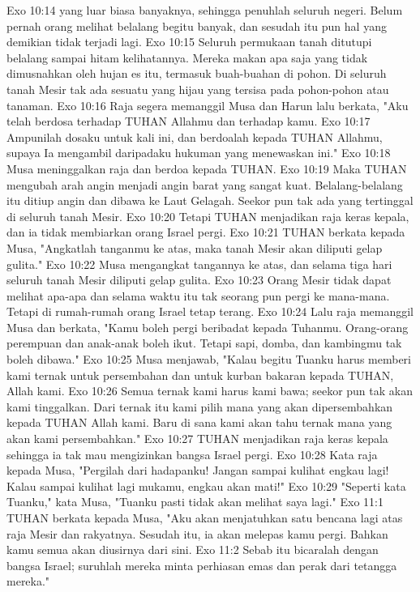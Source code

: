 Exo 10:14  yang luar biasa banyaknya, sehingga penuhlah seluruh negeri. Belum pernah orang melihat belalang begitu banyak, dan sesudah itu pun hal yang demikian tidak terjadi lagi.
Exo 10:15  Seluruh permukaan tanah ditutupi belalang sampai hitam kelihatannya. Mereka makan apa saja yang tidak dimusnahkan oleh hujan es itu, termasuk buah-buahan di pohon. Di seluruh tanah Mesir tak ada sesuatu yang hijau yang tersisa pada pohon-pohon atau tanaman.
Exo 10:16  Raja segera memanggil Musa dan Harun lalu berkata, "Aku telah berdosa terhadap TUHAN Allahmu dan terhadap kamu.
Exo 10:17  Ampunilah dosaku untuk kali ini, dan berdoalah kepada TUHAN Allahmu, supaya Ia mengambil daripadaku hukuman yang menewaskan ini."
Exo 10:18  Musa meninggalkan raja dan berdoa kepada TUHAN.
Exo 10:19  Maka TUHAN mengubah arah angin menjadi angin barat yang sangat kuat. Belalang-belalang itu ditiup angin dan dibawa ke Laut Gelagah. Seekor pun tak ada yang tertinggal di seluruh tanah Mesir.
Exo 10:20  Tetapi TUHAN menjadikan raja keras kepala, dan ia tidak membiarkan orang Israel pergi.
Exo 10:21  TUHAN berkata kepada Musa, "Angkatlah tanganmu ke atas, maka tanah Mesir akan diliputi gelap gulita."
Exo 10:22  Musa mengangkat tangannya ke atas, dan selama tiga hari seluruh tanah Mesir diliputi gelap gulita.
Exo 10:23  Orang Mesir tidak dapat melihat apa-apa dan selama waktu itu tak seorang pun pergi ke mana-mana. Tetapi di rumah-rumah orang Israel tetap terang.
Exo 10:24  Lalu raja memanggil Musa dan berkata, "Kamu boleh pergi beribadat kepada Tuhanmu. Orang-orang perempuan dan anak-anak boleh ikut. Tetapi sapi, domba, dan kambingmu tak boleh dibawa."
Exo 10:25  Musa menjawab, "Kalau begitu Tuanku harus memberi kami ternak untuk persembahan dan untuk kurban bakaran kepada TUHAN, Allah kami.
Exo 10:26  Semua ternak kami harus kami bawa; seekor pun tak akan kami tinggalkan. Dari ternak itu kami pilih mana yang akan dipersembahkan kepada TUHAN Allah kami. Baru di sana kami akan tahu ternak mana yang akan kami persembahkan."
Exo 10:27  TUHAN menjadikan raja keras kepala sehingga ia tak mau mengizinkan bangsa Israel pergi.
Exo 10:28  Kata raja kepada Musa, "Pergilah dari hadapanku! Jangan sampai kulihat engkau lagi! Kalau sampai kulihat lagi mukamu, engkau akan mati!"
Exo 10:29  "Seperti kata Tuanku," kata Musa, "Tuanku pasti tidak akan melihat saya lagi."
Exo 11:1  TUHAN berkata kepada Musa, "Aku akan menjatuhkan satu bencana lagi atas raja Mesir dan rakyatnya. Sesudah itu, ia akan melepas kamu pergi. Bahkan kamu semua akan diusirnya dari sini.
Exo 11:2  Sebab itu bicaralah dengan bangsa Israel; suruhlah mereka minta perhiasan emas dan perak dari tetangga mereka."
